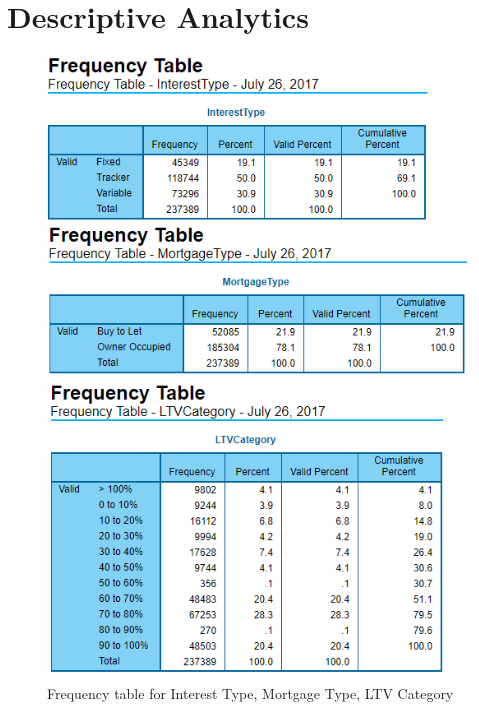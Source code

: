 %
%
%
%

\chapter{Descriptive Analytics}\label{C.Appendix3}

\begin{center}
\begin{figure}[!htb]
\includegraphics[scale=0.6]{freq.png}
\centering
\caption{Frequency table for Interest Type, Mortgage Type, LTV Category}
\label{fig:git}
\end{figure}
\end{center}

